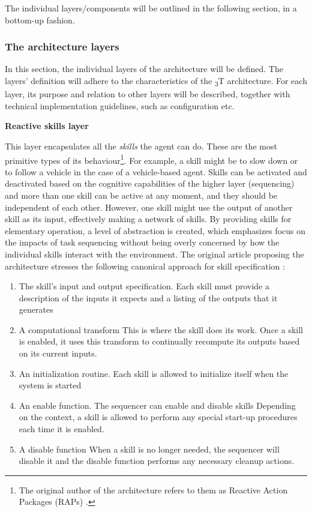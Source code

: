 \documentclass[main.tex]{subfiles}
\begin{document}
The individual layers/components will be outlined in the following section, in a bottom-up
fashion.

\subsubsection{The architecture layers}

In this section, the individual layers of the architecture will be defined. The layers' definition will 
adhere to the characteristics of the \textsubscript{3}T architecture. For each layer, its purpose and 
relation to other layers will be described, together with technical implementation guidelines, such as 
configuration etc.

\textbf{Reactive skills layer}

This layer encapsulates all the \emph{skills} the agent can do. These are the 
most primitive types of its behaviour\footnote{The original author of the architecture refers to them 
as Reactive Action Packages (RAPs) \cite{Firby1987}.}. For example, a skill might be to slow
down or to follow a vehicle in the case of a vehicle-based agent. Skills can be activated and deactivated based 
on the cognitive capabilities of the higher layer (sequencing) and more than one skill can be active at 
any moment, and they should be independent of each other. However, one skill might use the output of another 
skill as its input, effectively making a network of skills. By providing skills for elementary operation,
a level of abstraction is created, which emphasizes focus on the impacts of task sequencing without being 
overly concerned by how the individual skills interact with the environment. The original article 
proposing the architecture stresses the following canonical approach for skill specification
\cite{Bonasso1995}:

\begin{enumerate}
    \item The skill's input and output specification. Each skill must provide a
description of the inputs it expects and a listing of the outputs that it
generates 
    \item A computational transform This is where the skill does its work. Once a
skill is enabled, it uses this transform to continually recompute its outputs
based on its current inputs.
    \item An initialization routine. Each skill is allowed to initialize itself when the system is started 
    \item An enable function. The sequencer can enable and disable skills Depending on the
    context, a skill is allowed to perform any special start-up procedures each
    time it is enabled.
    \item A disable function When a skill is no longer needed, the sequencer will disable it
    and the disable function performs any necessary cleanup actions.
\end{enumerate}
\end{document}
